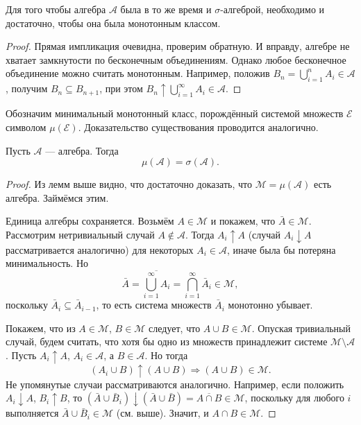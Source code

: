 \begin{lemma}\label{the:monoton}
  Для того чтобы алгебра $ \mathscr A $ была в то же время и $ \sigma
  $-алгеброй, необходимо и достаточно, чтобы она была монотонным классом.
\end{lemma}
\begin{proof}
  Прямая импликация очевидна, проверим обратную. И вправду, алгебре не хватает замкнутости по бесконечным объединениям. Однако
  любое бесконечное объединение можно считать монотонным. Например, положив $
B_n = \bigcup\limits_{i=1}^n A_i \in \mathscr A $, получим $ B_n \subseteq B_{n+1} $,
при этом $ B_n \uparrow \bigcup\limits_{i=1}^\infty A_i \in \mathscr A $.
\end{proof}
Обозначим минимальный монотонный класс, порождённый системой множеств $ \mathscr
E$ символом $ \mu(\mathscr E) $. Доказательство существования проводится
аналогично.

\begin{theorem}
  Пусть $ \mathscr A $ --- алгебра. Тогда 
  \[
      \mu(\mathscr A) = \sigma(\mathscr A).
  \]
\end{theorem}
\begin{proof}
  Из лемм выше видно, что достаточно доказать, что $\mathscr M = \mu(\mathscr A) $ есть
  алгебра. Займёмся этим.

  Единица алгебры сохраняется. Возьмём $ A \in \mathscr M $ и покажем, что $ \bar A \in \mathscr M $.
  Рассмотрим нетривиальный случай $ A \notin \mathscr A $. Тогда $ A_i \uparrow
  A$ (случай $ A_i \downarrow A $ рассматривается аналогично) для некоторых $ A_i \in \mathscr A $, иначе была
  бы потеряна минимальность. Но 
  \[
    \bar A =\overline{\bigcup_{i=1}^\infty A_i} = \bigcap_{i=1}^\infty \bar A_i
    \in \mathscr M,
  \]
  поскольку $ \bar A_i \subseteq \bar A_{i-1} $, то есть система множеств $ \bar
  A_i$ монотонно убывает.

  Покажем, что из $ A \in \mathscr M $, $ B \in \mathscr M $ следует, что $ A
  \cup B \in \mathscr M $. Опуская тривиальный случай, будем считать, что хотя
  бы одно из множеств принадлежит системе $ \mathscr M \setminus \mathscr A $.
  Пусть $ A_i \uparrow A $, $ A_i \in \mathscr A $, а $ B \in \mathscr A $. Но
  тогда 
  \[
  (A_i\cup B) \uparrow (A\cup B) \Rightarrow (A\cup B) \in \mathscr M. 
  \]
  Не упомянутые случаи
  рассматриваются аналогично. Например, если положить $ A_i \downarrow A $, $
  B_i \uparrow B $, то $ (\bar A \cup \bar B_i) \downarrow (\bar A
  \cup \bar B) = \overline{A \cap B} \in \mathscr M $, поскольку для любого $ i
  $ выполняется $ \bar A \cup \bar B_i \in \mathscr M $ (см. выше). Значит, и $ A \cap B \in
  \mathscr M$.
\end{proof}

